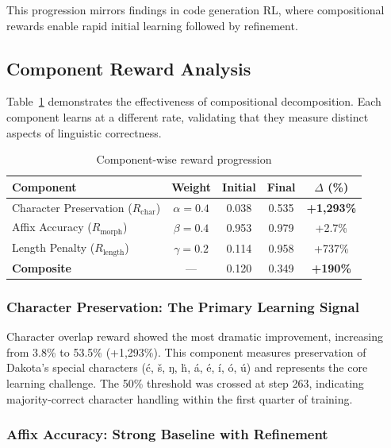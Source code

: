 \documentclass{article}
\newcommand{\Rchar}{R_{\text{char}}}
\newcommand{\Rmorph}{R_{\text{morph}}}
\begin{document}
This progression mirrors findings in code generation RL, where compositional rewards enable rapid initial learning followed by refinement.

\subsection{Component Reward Analysis}

Table~\ref{tab:component_rewards} demonstrates the effectiveness of compositional decomposition. Each component learns at a different rate, validating that they measure distinct aspects of linguistic correctness.

\begin{table}[t]
\centering
\caption{Component-wise reward progression}
\label{tab:component_rewards}
\begin{tabular}{lcccc}
\toprule
\textbf{Component} & \textbf{Weight} & \textbf{Initial} & \textbf{Final} & \textbf{$\Delta$ (\%)} \\
\midrule
Character Preservation ($\Rchar$) & $\alpha = 0.4$ & 0.038 & 0.535 & \textbf{+1,293\%} \\
Affix Accuracy ($\Rmorph$) & $\beta = 0.4$ & 0.953 & 0.979 & +2.7\% \\
Length Penalty ($R_{\text{length}}$) & $\gamma = 0.2$ & 0.114 & 0.958 & +737\% \\
\midrule
\textbf{Composite} & --- & 0.120 & 0.349 & \textbf{+190\%} \\
\bottomrule
\end{tabular}
\end{table}

\subsubsection{Character Preservation: The Primary Learning Signal}

Character overlap reward showed the most dramatic improvement, increasing from 3.8\% to 53.5\% (+1,293\%). This component measures preservation of Dakota's special characters (ć, š, ŋ, ḣ, á, é, í, ó, ú) and represents the core learning challenge. The 50\% threshold was crossed at step 263, indicating majority-correct character handling within the first quarter of training.

\subsubsection{Affix Accuracy: Strong Baseline with Refinement}
\end{document}
